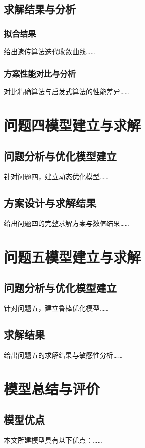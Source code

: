 \documentclass[bwprint]{gmcmthesis}
\begin{document}
\subsection{求解结果与分析}

\subsubsection{拟合结果}
给出遗传算法迭代收敛曲线……

\subsubsection{方案性能对比与分析}
对比精确算法与启发式算法的性能差异……

\clearpage
\section{问题四模型建立与求解}

\subsection{问题分析与优化模型建立}
针对问题四，建立动态优化模型……

\subsection{方案设计与求解结果}
给出问题四的完整求解方案与数值结果……

\clearpage
\section{问题五模型建立与求解}

\subsection{问题分析与优化模型建立}
针对问题五，建立鲁棒优化模型……

\subsection{求解结果}
给出问题五的求解结果与敏感性分析……

\clearpage
\section{模型总结与评价}

\subsection{模型优点}
本文所建模型具有以下优点：……
\end{document}
